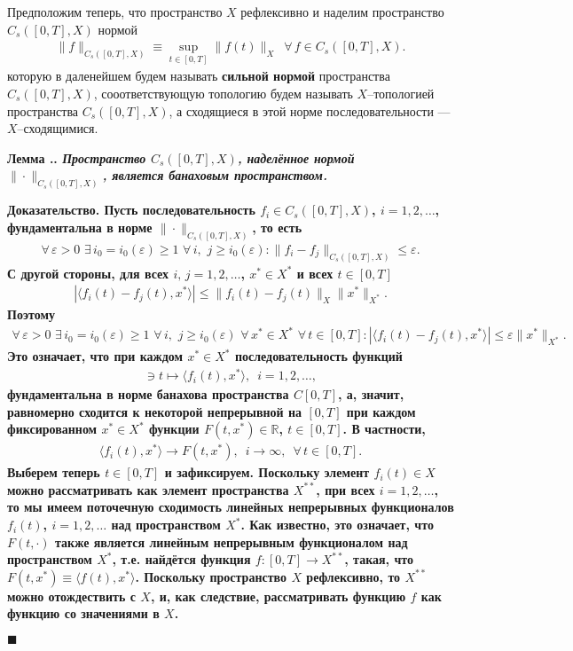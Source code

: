 \documentclass{report}
\newcounter{lem}[section]
\renewcommand{\thelem}{\thesection.\arabic{lem}}
\newenvironment{Lemma}{\par\refstepcounter{lem}\bf Лемма \thelem. \it}{\rm\par}
\newenvironment{Proof}{\par\noindent\bf Доказательство.\rm}{ $\blacksquare$\par}
\begin{document}
Предположим теперь, что пространство $X$ рефлексивно и наделим пространство $C_s([0,T],X)$ нормой
\begin{gather*}
\|f\|_{C_s([0,T],X)}\equiv\sup\limits_{t\in[0,T]}\|f(t)\|_X\,\,\,\forall\,f\in C_s([0,T],X).
\end{gather*}
которую в даленейшем будем называть \textbf{сильной нормой} пространства $C_s([0,T],X)$, сооответствующую топологию будем называть $X$--топологией пространства $C_s([0,T],X)$, а сходящиеся
в этой норме последовательности --- $X$--сходящимися.

\begin{Lemma}\label{completness_of_Cs([0,T],X)_with_strong_norm}
Пространство $C_s([0,T],X)$, наделённое нормой $\|\cdot\|_{C_s([0,T],X)}$, является банаховым пространством.
\end{Lemma}
\begin{Proof}
Пусть последовательность $f_i\in C_s([0,T],X)$, $i=1,2,\dots$, фундаментальна в норме $\|\cdot\|_{C_s([0,T],X)}$, то есть
\begin{gather*}
\forall\,\varepsilon>0\,\,\exists\,i_0=i_0(\varepsilon)\geqslant1\,\,\forall\,i,\,\,j\geqslant i_0(\varepsilon):\|f_i-f_j\|_{C_s([0,T],X)}\leqslant\varepsilon.
\end{gather*}
С другой стороны, для всех $i,\,j=1,2,\dots$, $x^*\in X^*$ и всех $t\in[0,T]$
\begin{gather*}
|\langle f_i(t)-f_j(t),x^*\rangle|\leqslant\|f_i(t)-f_j(t)\|_X\|x^*\|_{X^*}.
\end{gather*}
Поэтому
\begin{gather}\label{metka_Cs2}
\forall\,\varepsilon>0\,\,\exists\,i_0=i_0(\varepsilon)\geqslant1\,\,\forall\,i,\,\,j\geqslant i_0(\varepsilon)\,\,\forall\,x^*\in X^*\,\,\forall\,t\in[0,T]:
|\langle f_i(t)-f_j(t),x^*\rangle|\leqslant\varepsilon\|x^*\|_{X^*}.
\end{gather}
Это означает, что при каждом $x^*\in X^*$ последовательность функций
\begin{gather*}
[0,T]\ni t\mapsto \langle f_i(t),x^*\rangle,\,\,\,i=1,2,\dots,
\end{gather*}
фундаментальна в норме банахова пространства $C[0,T]$, а, значит, равномерно сходится к некоторой непрерывной на $[0,T]$ при каждом фиксированном $x^*\in X^*$  функции
$F(t,x^*)\in\mathbb{R}$, $t\in[0,T]$. В частности,
\begin{gather*}
\langle f_i(t),x^*\rangle\to F(t,x^*),\,\,\,i\to\infty,\,\,\,\forall\,t\in[0,T].
\end{gather*}
Выберем теперь $t\in[0,T]$ и зафиксируем. Поскольку элемент $f_i(t)\in X$ можно рассматривать как элемент пространства $X^{**}$, при всех $i=1,2,\dots$, то мы имеем поточечную сходимость
линейных непрерывных функционалов $f_i(t)$, $i=1,2,\dots$ над пространством $X^*$. Как известно, это означает, что $F(t,\cdot)$ также является линейным непрерывным функционалом над
пространством $X^*$, т.е. найдётся функция $f\colon[0,T]\to X^{**}$, такая, что $F(t,x^*)\equiv\langle f(t),x^*\rangle$. Поскольку пространство $X$ рефлексивно, то $X^{**}$ можно
отождествить с $X$, и, как следствие, рассматривать функцию $f$ как функцию со значениями в $X$.


\end{Proof}
\end{document}
